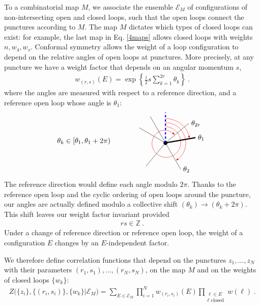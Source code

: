 \documentclass[12pt, a4paper]{article}
\begin{document}
To a combinatorial map $M$, we associate the ensemble $\mathcal{E}_M$ of configurations of non-intersecting open and closed loops, such that the open loops connect the punctures according to $M$. The map $M$ dictates which types of closed loops can exist: for example, the last map in Eq. \eqref{4maps} allows closed loops with weights $n,w_4,w_s$. Conformal symmetry allows the weight of a loop configuration to depend on the relative angles of open loops at punctures. More precisely, at any puncture we have a weight factor that depends on an angular momentum $s$,
\begin{align}
 \boxed{w_{(r,s)}(E) = \exp \left\{\tfrac{i}{2} s\textstyle{\sum}_{k=1}^{2r}\theta_{k}\right\}}\ .
 \label{wrs}
\end{align}
where the angles are measured with respect to a reference direction, and a reference open loop whose angle is $\theta_1$:
\begin{align}
 \theta_{k}\in [\theta_{1}, \theta_{1}+2\pi)
\qquad \qquad 
 \begin{tikzpicture}[baseline=(base), scale = .5]
  \coordinate (base) at (0, 0);
  \draw [domain=0:410,variable=\t,smooth,samples=35,red,-latex]
        plot ({90-\t}: {1.6- \t/1000});
  \draw[-latex, red] (0, 2.4) arc (90:10:2.4);
  \draw[-latex, red] (0, 2) arc (90:-60:2);
  \draw (0, 0) node[fill, circle, minimum size = 2mm, inner sep = 0]{};
  \foreach\t in {10, 40, 120, 150, 230, 300}{
  \draw (0, 0) -- ++(\t:3);
  }
  \draw[ultra thick, blue, dashed] (0, 0) -- ++(90:3);
  \draw[ultra thick] (0, 0) -- ++(10:3);
  \node[right] at ++(10:3) {$\theta_{1}$};
  \node[right] at ++(300:3) {$\theta_{2}$};
  \node[right] at ++(40:3) {$\theta_{2r}$};
 \end{tikzpicture}
 \label{titt}
\end{align}
The reference direction would define each angle modulo $2\pi$. Thanks to the reference open loop and the cyclic ordering of open loops around the puncture, our angles are actually defined modulo a collective shift $(\theta_k) \to (\theta_k+2\pi)$. This shift leaves our weight factor invariant provided 
\begin{align}
 rs\in \mathbb{Z}\ . 
\end{align}
Under a change of reference direction or reference open loop, the weight of a configuration $E$ changes by an $E$-independent factor.

We therefore define correlation functions that depend on the punctures $z_1,\dots,z_N$ with their parameters $(r_1,s_1),\dots, (r_N,s_N)$, on the map $M$ and on the weights of closed loops $\{w_k\}$:
\begin{align}
 \boxed{Z\Big(\{z_i\},\{(r_i,s_i)\},\{w_k\}\Big|\mathcal{E}_M\Big) =\sum_{E\in\mathcal{E}_M} \prod_{i=1}^N w_{(r_i,s_i)}(E) \prod_{\substack{\ell\in E\\ \ell \text{ closed}}} w(\ell)} \ .
 \label{zbig}
\end{align}
\end{document}

